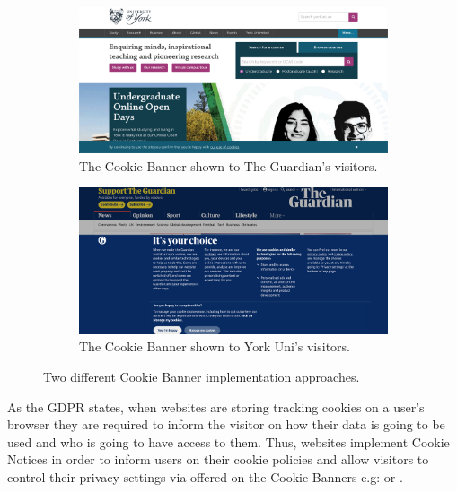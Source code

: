 \documentclass[../main.tex]{subfiles}
\begin{document}
\begin{figure}[ht!]
    \centering
    \begin{subfigure}[b]{0.45\textwidth}
        \includegraphics[width=\textwidth]{images/intro/guardian}
        \caption{The  Cookie Banner shown to The Guardian's visitors.}
        \label{fig:intro_cookie_guardian}
    \end{subfigure}
    \hfill
    \begin{subfigure}[b]{0.45\textwidth}
        \includegraphics[width=\textwidth]{images/intro/york}
        \caption{The  Cookie Banner shown to York Uni's visitors.}
        \label{fig:intro_cookie_york}
    \end{subfigure}
    \caption{Two different Cookie Banner implementation approaches.}
    \label{fig:intro_cookie}
\end{figure}

As the GDPR states, when websites are storing tracking cookies on a user’s browser they are required to inform the visitor on how their data is going to be used and who is going to have access to them. Thus, websites implement Cookie Notices in order to inform users on their cookie policies and allow visitors to control their privacy settings via  offered on the Cookie Banners e.g:  or .
\end{document}
